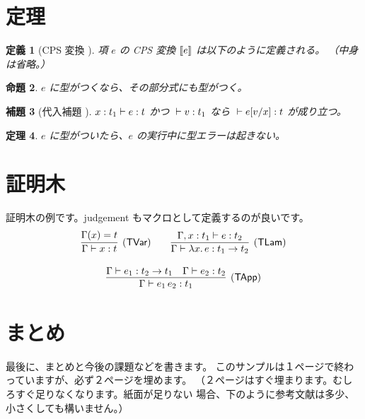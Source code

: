 \documentclass[twoside, twocolumn, a4paper]{jarticle}
\newtheorem{definition}{定義}
\newtheorem{proposition}[definition]{命題}
\newtheorem{lemma}[definition]{補題}
\newtheorem{theorem}[definition]{定理}
\begin{document}
\section{定理}\label{sec:theorem}
\begin{definition}[CPS 変換 \cite{Plotkin1975}]
\upshape %
項 $e$ の CPS 変換 $[\![{e]\!]}$ は以下のように定義される。
（中身は省略。）
\end{definition}

\begin{proposition}
$e$ に型がつくなら、その部分式にも型がつく。
\end{proposition}

\begin{lemma}[代入補題 \cite{WF1994}]
${x:t_1}\vdash{e}:{t}$ かつ ${}\vdash{v}:{t_1}$ なら
${}\vdash{e[v/x]}:{t}$ が成り立つ。
\end{lemma}

\begin{theorem}
$e$ に型がついたら、$e$ の実行中に型エラーは起きない。
\end{theorem}

\section{証明木}\label{sec:proof}
証明木の例です。judgement もマクロとして定義するのが良いです。
\[
\begin{array}{c}
\infer[(\textsf{TVar})]
      {\Judge{\Gamma}{x}{t}}
      {\Gamma(x)=t}
\qquad
\infer[(\textsf{TLam})]
      {\Judge{\Gamma}{\Lam{x}{e}}{\Arrow{t_1}{t_2}}}
      {\Judge{\Gamma,x:t_1}{e}{t_2}} \\
\ \\
\infer[(\textsf{TApp})]
      {\Judge{\Gamma}{\App{e_1}{e_2}}{t_1}}
      {\Judge{\Gamma}{e_1}{\Arrow{t_2}{t_1}}
      &\Judge{\Gamma}{e_2}{t_2}} \\
\end{array}
\]

\section{まとめ}\label{sec:conclusion}
最後に、まとめと今後の課題などを書きます。
このサンプルは１ページで終わっていますが、必ず２ページを埋めます。
（２ページはすぐ埋まります。むしろすぐ足りなくなります。紙面が足りない
場合、下のように参考文献は多少、小さくしても構いません。）

\small %



\end{document}

